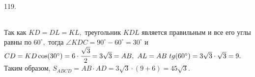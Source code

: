 119. \begin{figure}[ht!]
\end{figure}\\
Так как $KD=DL=KL,$ треугольник $KDL$ является правильным и все его углы равны по $60^\circ,$ тогда $\angle KDC=90^\circ-60^\circ=30^\circ$ и $CD=KD\cos(30^\circ)=6\cdot\cfrac{\sqrt{3}}{2}=3\sqrt{3}=AB,\ AL=AB\ tg(60^\circ)=3\sqrt{3}\cdot\sqrt{3}=9.$ Таким образом, $S_{ABCD}=AB\cdot AD=3\sqrt{3}\cdot(9+6)=45\sqrt{3}.$\\
